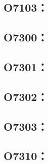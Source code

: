\subsection{O7103：}



\clearpage
\subsection{O7300：}



\subsection{O7301：}



\clearpage
\subsection{O7302：}



\subsection{O7303：}



\subsection{O7310：}



